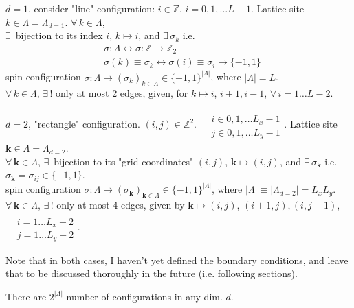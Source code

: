 \documentclass[10pt]{amsart}
\begin{document}
\begin{multicols*}{2}
$d=1$, consider "line" configuration: $i \in \mathbb{Z}$, $i=0,1,\dots L-1$.  Lattice site $k \in \Lambda = \Lambda_{d=1}$.  $\forall \, k \in \Lambda$, \\ 
$\exists \, $ bijection to its index $i$, $k\mapsto i$, and $\exists \, \sigma_k$ i.e. 
\[
\begin{aligned}
	& \sigma : \Lambda \leftrightarrow \sigma: \mathbb{Z} \to \mathbb{Z}_2 \\ 
	& \sigma(k) \equiv \sigma_k \leftrightarrow \sigma(i) \equiv \sigma_i \mapsto \lbrace -1, 1 \rbrace
\end{aligned}
\]
spin configuration $\sigma : \Lambda \mapsto (\sigma_k)_{k\in \Lambda} \in \lbrace -1,1 \rbrace^{| \Lambda |}$, where $|\Lambda | =L$.  \\
$\forall \, k \in \Lambda$, $\exists \, ! $ only at most 2 edges, given, for $k\mapsto i$, $i+1,i-1$, $\forall \, i = 1 \dots L-2$.  

$d=2$, "rectangle" configuration.  $(i,j) \in \mathbb{Z}^2$.   $\begin{aligned} & \quad \\ 
&	 i \in 0,1,\dots L_x-1 \\ 
&	 j \in 0,1,\dots L_y-1 \end{aligned}$.  Lattice site $\mathbf{k} \in \Lambda = \Lambda_{d=2}$.  \\ $\forall \, \mathbf{k} \in \Lambda$, $\exists \, $ bijection to its "grid coordinates" $(i,j)$, $\mathbf{k} \mapsto (i,j)$, and $\exists \, \sigma_{\mathbf{k}} $ i.e. $\sigma_{\mathbf{k}} = \sigma_{ij} \in \lbrace -1,1\rbrace$.  \\
spin configuration $\sigma: \Lambda \mapsto (\sigma_{\mathbf{k}})_{\mathbf{k} \in \Lambda} \in \lbrace -1,1\rbrace^{|\Lambda|}$, where $|\Lambda | \equiv |\Lambda_{d=2} | = L_xL_y$.  \\
$\forall \, \mathbf{k} \in \Lambda$, $\exists \, !$ only at most 4 edges, given by $\mathbf{k} \mapsto (i,j)$, $(i \pm 1, j ), (i,j\pm 1)$, \  $\begin{aligned} & \quad \\ & i = 1\dots L_x -2 \\ & j = 1\dots L_y-2 \end{aligned}$.  

Note that in both cases, I haven't yet defined the boundary conditions, and leave that to be discussed thoroughly in the future (i.e. following sections).  

There are $2^{|\Lambda|}$ number of configurations in any dim. $d$.  


\end{multicols*}
\end{document}

